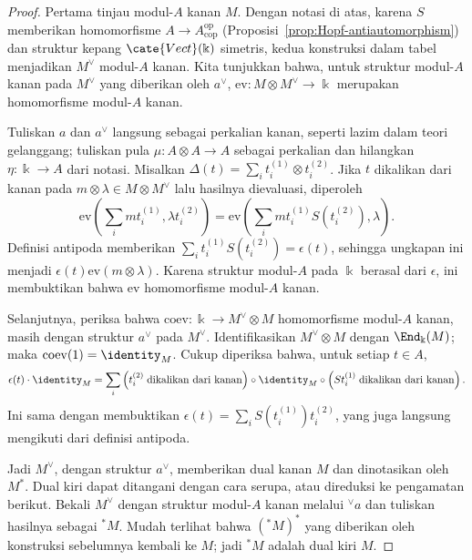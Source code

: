 \begin{proof}
	Pertama tinjau modul-$A$ kanan $M$. Dengan notasi di atas, karena $S$
	memberikan homomorfisme $A\to A^{\mathrm{op}}_{\mathrm{cop}}$
	(Proposisi~\ref{prop:Hopf-antiautomorphism}) dan struktur kepang
	$\cate{Vect}(\Bbbk)$ simetris, kedua konstruksi dalam tabel menjadikan
	$M^\vee$ modul-$A$ kanan. Kita tunjukkan bahwa, untuk struktur
	modul-$A$ kanan pada $M^\vee$ yang diberikan oleh $a^\vee$,
	$\mathrm{ev}:M\otimes M^\vee\to\Bbbk$ merupakan homomorfisme
	modul-$A$ kanan.

	Tuliskan $a$ dan $a^\vee$ langsung sebagai perkalian kanan, seperti
	lazim dalam teori gelanggang; tuliskan pula
	$\mu:A\otimes A\to A$ sebagai perkalian dan hilangkan
	$\eta:\Bbbk\to A$ dari notasi. Misalkan
	$\Delta(t)=\sum_i t_i^{(1)}\otimes t_i^{(2)}$. Jika $t$ dikalikan dari
	kanan pada $m\otimes\lambda\in M\otimes M^\vee$ lalu hasilnya
	dievaluasi, diperoleh
	\[ \mathrm{ev}\left( \sum_i m t_i^{(1)}, \lambda t_i^{(2)} \right) = \mathrm{ev}\left( \sum_i m t_i^{(1)} S\left(t_i^{(2)}\right), \lambda \right). \]
	Definisi antipoda memberikan
	$\sum_i t_i^{(1)}S(t_i^{(2)})=\epsilon(t)$, sehingga ungkapan ini
	menjadi $\epsilon(t)\mathrm{ev}(m\otimes\lambda)$. Karena struktur
	modul-$A$ pada $\Bbbk$ berasal dari $\epsilon$, ini membuktikan bahwa
	$\mathrm{ev}$ homomorfisme modul-$A$ kanan.

	Selanjutnya, periksa bahwa
	$\mathrm{coev}:\Bbbk\to M^\vee\otimes M$ homomorfisme modul-$A$ kanan,
	masih dengan struktur $a^\vee$ pada $M^\vee$. Identifikasikan
	$M^\vee\otimes M$ dengan $\End_{\Bbbk}(M)$; maka
	$\mathrm{coev}(1)=\identity_M$. Cukup diperiksa bahwa, untuk setiap
	$t\in A$,
	\[ \epsilon(t) \cdot \identity_M = \sum_i \left( t_i^{(2)} \;\text{dikalikan dari kanan} \right) \circ \identity_M \circ \left( S t_i^{(1)} \;\text{dikalikan dari kanan} \right). \]
	Ini sama dengan membuktikan
	$\epsilon(t)=\sum_iS(t_i^{(1)})t_i^{(2)}$, yang juga langsung mengikuti
	dari definisi antipoda.

	Jadi $M^\vee$, dengan struktur $a^\vee$, memberikan dual kanan $M$ dan
	dinotasikan oleh $M^*$. Dual kiri dapat ditangani dengan cara serupa,
	atau direduksi ke pengamatan berikut. Bekali $M^\vee$ dengan struktur
	modul-$A$ kanan melalui ${}^\vee a$ dan tuliskan hasilnya sebagai
	${}^*M$. Mudah terlihat bahwa $({}^*M)^*$ yang diberikan oleh konstruksi
	sebelumnya kembali ke $M$; jadi ${}^*M$ adalah dual kiri $M$.


\end{proof}
